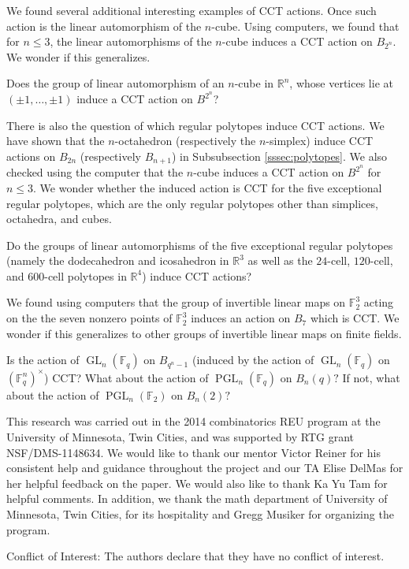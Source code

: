\documentclass[smallextended, envcountsame, numbook]{svjour3}
\numberwithin{equation}{section}
\begin{document}
We found several additional interesting examples of CCT actions. Once such action is the linear automorphism of the $n$-cube. Using computers, we found that for $n \leq 3$, the linear automorphisms of the $n$-cube induces a CCT action on $B_{2^n}$. We wonder if this generalizes.

\begin{question}
\label{question:cube_cct}
Does the group of linear automorphism of an $n$-cube in $\mathbb R^n$, whose vertices lie at $(\pm 1, \ldots, \pm 1)$ induce a CCT action on $B^{2^n}$?
\end{question}

There is also the question of which regular polytopes induce CCT actions. We have shown that the $n$-octahedron (respectively the $n$-simplex) induce CCT actions on $B_{2n}$ (respectively $B_{n+1}$) in Subsubsection \ref{sssec:polytopes}. We also checked using the computer that the $n$-cube induces a CCT action on $B^{2^n}$ for $n \leq 3$. We wonder whether the induced action is CCT for the five exceptional regular polytopes, which are the only regular polytopes other than simplices, octahedra, and cubes.

\begin{question}
\label{question:exceptional_polytopes_cct}
Do the groups of linear automorphisms of the five exceptional regular polytopes (namely the dodecahedron and icosahedron in $\mathbb R^3$ as well as the $24$-cell, $120$-cell, and $600$-cell polytopes in $\mathbb R^4$) induce CCT actions?
\end{question}

We found using computers that the group of invertible linear maps on $\mathbb F_2^3$ acting on the the seven nonzero points of $\mathbb F_2^3$ induces an action on $B_7$ which is CCT. We wonder if this generalizes to other groups of invertible linear maps on finite fields.

\begin{question}
Is the action of $\operatorname{GL}_n(\mathbb F_q)$ on $B_{q^n-1}$ (induced by the action of $\operatorname{GL}_n(\mathbb F_q)$ on $(\mathbb F_q^n)^\times$) CCT? What about the action of $\operatorname{PGL}_n(\mathbb F_q)$ on $B_n(q)?$ If not, what about the action of $\operatorname{PGL}_n(\mathbb F_2)$ on $B_n(2)?$ 
\end{question}

\begin{acknowledgements}
This research was carried out in the 2014 combinatorics REU program at the University of Minnesota, Twin Cities, and was supported by RTG grant NSF/DMS-1148634.
We would like to thank our mentor Victor Reiner for his consistent help and guidance throughout the project and our TA Elise DelMas for her helpful feedback on the paper. We would also like to thank Ka Yu Tam for helpful comments.  In addition, we thank the math department of University of Minnesota, Twin Cities, for its hospitality and Gregg Musiker for organizing the program.
\end{acknowledgements}

Conflict of Interest: The authors declare that they have no conflict of interest.

\medskip 

\nocite{*}



\end{document}
